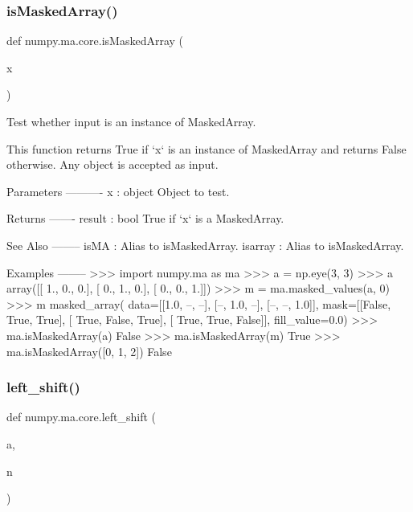 \mbox{\label{namespacenumpy_1_1ma_1_1core_a2178e119b434c64accd38693f05d5f22}} 
\subsubsection{\texorpdfstring{is\+Masked\+Array()}{isMaskedArray()}}
{\footnotesize\ttfamily def numpy.\+ma.\+core.\+is\+Masked\+Array (\begin{DoxyParamCaption}\item[{}]{x }\end{DoxyParamCaption})}

\begin{DoxyVerb}Test whether input is an instance of MaskedArray.

This function returns True if `x` is an instance of MaskedArray
and returns False otherwise.  Any object is accepted as input.

Parameters
----------
x : object
    Object to test.

Returns
-------
result : bool
    True if `x` is a MaskedArray.

See Also
--------
isMA : Alias to isMaskedArray.
isarray : Alias to isMaskedArray.

Examples
--------
>>> import numpy.ma as ma
>>> a = np.eye(3, 3)
>>> a
array([[ 1.,  0.,  0.],
       [ 0.,  1.,  0.],
       [ 0.,  0.,  1.]])
>>> m = ma.masked_values(a, 0)
>>> m
masked_array(
  data=[[1.0, --, --],
        [--, 1.0, --],
        [--, --, 1.0]],
  mask=[[False,  True,  True],
        [ True, False,  True],
        [ True,  True, False]],
  fill_value=0.0)
>>> ma.isMaskedArray(a)
False
>>> ma.isMaskedArray(m)
True
>>> ma.isMaskedArray([0, 1, 2])
False\end{DoxyVerb}
 \mbox{\label{namespacenumpy_1_1ma_1_1core_a4f5d44a5c0905b233f56e464119180ca}} 
\subsubsection{\texorpdfstring{left\+\_\+shift()}{left\_shift()}}
{\footnotesize\ttfamily def numpy.\+ma.\+core.\+left\+\_\+shift (\begin{DoxyParamCaption}\item[{}]{a,  }\item[{}]{n }\end{DoxyParamCaption})}


